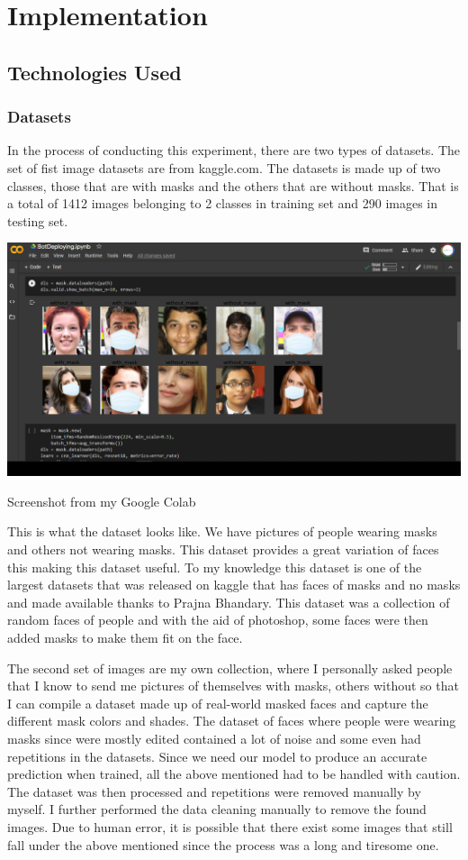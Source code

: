 \chapter{Implementation}

\section{Technologies Used}

\subsection{Datasets}
In the process of conducting this experiment, there are two types of datasets. 
The set of fist image datasets are from kaggle.com. The datasets is made up of two classes, those that are with masks and the others that are without masks.
That is a total of 1412 images belonging to 2 classes in training set and 290 images in testing set.


    \centerline{\includegraphics[width=.6\textwidth,height=.5\textheight,keepaspectratio]{tex/images/Screenshot_Masks.png}}
     \caption{Screenshot from my Google Colab}
    \label{fig}

This is what the dataset looks like. We have pictures of people wearing masks and others not wearing masks.  This dataset provides a great variation of faces
this making this dataset useful. To my knowledge this dataset is one of the largest datasets that was released on kaggle that has faces of masks and no masks and made available thanks to Prajna Bhandary.
This dataset was a collection of random faces of people and with the aid of photoshop, some faces were then added masks to make them fit on the face\vspace{5mm}. 

The second set of images are my own collection, where I personally asked people that I know to send me pictures of themselves
with masks, others without so that I can compile a dataset made up of real-world masked faces and capture the different mask colors and shades. The dataset of faces where people were wearing masks since were mostly edited contained a lot of noise and some even had repetitions in the datasets. Since we need our model to produce an accurate prediction when trained, all the above mentioned had to be handled with caution. The dataset was then processed and repetitions were removed manually by myself. I further performed the data cleaning manually to remove the found images. Due to human error, it is possible that there exist some images that still fall under the above mentioned since the process was a long and tiresome one.  
